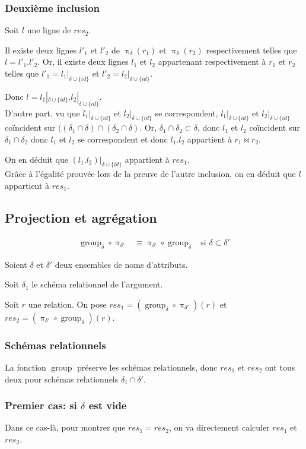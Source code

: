 \documentclass[french]{article}
\DeclareMathOperator{\proj}{\pi}
\DeclareMathOperator{\group}{group}
\newcommand{\projDelta}{\proj_{\delta}}
\newcommand{\groupDelta}{\group_{\delta}}
\newcommand{\cip}{\cup \{id\}}
\newcommand{\dilta}{{\delta \cip}}
\newcommand{\intro}[2]{Soit $r$ une relation. On pose $res_1 = (#1)(r) $ et $res_2 = (#2)(r) $}
\begin{document}
\subsubsection*{Deuxième inclusion}
Soit $l$ une ligne de $res_2$.

Il existe deux lignes $l'_1$ et $l'_2$ de $\projDelta(r_1)$
et $\projDelta(r_2)$ respectivement telles que
$l = l'_1 . l'_2$.
Or, il existe deux lignes $l_1$ et $l_2$ appartenant respectivement
à $r_1$ et $r_2$ telles que 
$l'_1 = l_1 |_\dilta$
et 
$l'_2 = l_2 |_\dilta$.

Donc $l = l_1 |_\dilta . l_2 |_\dilta$. \\

D'autre part,
vu que $l_1|_\dilta$ et $l_2|_\dilta$ se correspondent,
$l_1|_\dilta$ et $l_2|_\dilta$ coïncident sur 
$((\delta_1 \cap \delta) \cap (\delta_2 \cap \delta)$.
Or, $\delta_1 \cap \delta_2 \subset \delta$,
donc $l_1$ et $l_2$ coïncident sur $\delta_1 \cap \delta_2$
donc $l_1$ et $l_2$ se correspondent et donc
$l_1 . l_2$ appartient à $r_1 \Join r_2$.

On en déduit que $\left( l_1 . l_2 \right)|_\dilta$
appartient à $res_1$. \\

Grâce à l'égalité prouvée lors de la preuve de l'autre inclusion,
on en déduit que $l$ appartient à $res_1$.

\subsection*{Projection et agrégation}
\begin{align*}
\groupDelta \circ \proj_{\delta'}
& \equiv \proj_{\delta'} \circ \groupDelta
& \text{si $\delta \subset \delta'$}
\end{align*}

Soient $\delta$ et $\delta'$ deux ensembles de noms d'attributs.

Soit $\delta_1$ le schéma relationnel de l'argument.

\intro{\groupDelta \circ \proj_{\delta'}}{\proj_{\delta'} \circ \groupDelta}.

\subsubsection*{Schémas relationnels}
La fonction $\group$ préserve les schémas relationnels,
donc $res_1$ et $res_2$ ont tous deux pour schémas relationnels
$\delta_1 \cap \delta'$.

\subsubsection*{Premier cas: si $\delta$ est vide}
Dans ce cas-là, pour montrer que $res_1 = res_2$,
on va directement calculer $res_1$ et $res_2$.
\end{document}
